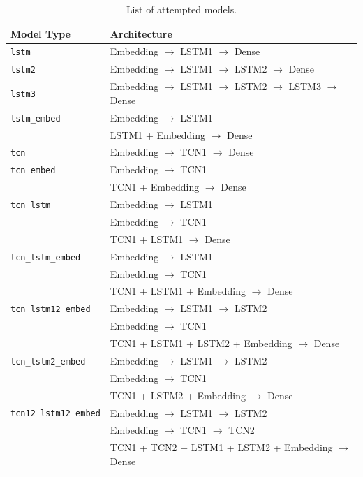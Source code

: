 \documentclass[12pt]{article}
\begin{document}
\begin{table}[h!]
	\centering
	\begin{tabular}{C{0.25\textwidth}C{0.65\textwidth}}
		\toprule
		Model Type                    & Architecture                                                      \\\midrule
		\texttt{lstm}                 & Embedding \(\to\) LSTM1 \(\to\) Dense                             \\\midrule
		\texttt{lstm2}                & Embedding \(\to\) LSTM1 \(\to\) LSTM2 \(\to\) Dense               \\\midrule
		\texttt{lstm3}                & Embedding \(\to\) LSTM1 \(\to\) LSTM2 \(\to\) LSTM3 \(\to\) Dense \\\midrule
		\texttt{lstm\_embed}          & Embedding \(\to\) LSTM1                                           \\
		                              & LSTM1 + Embedding \(\to\) Dense                                   \\\midrule
		\texttt{tcn}                  & Embedding \(\to\) TCN1 \(\to\) Dense                              \\\midrule
		\texttt{tcn\_embed}           & Embedding \(\to\) TCN1                                            \\
		                              & TCN1 + Embedding \(\to\) Dense                                    \\\midrule
		\texttt{tcn\_lstm}            & Embedding \(\to\) LSTM1                                           \\ & Embedding \(\to\) TCN1 \\ & TCN1 + LSTM1 \(\to\) Dense                                   \\\midrule
		\texttt{tcn\_lstm\_embed}     & Embedding \(\to\) LSTM1                                           \\ & Embedding \(\to\) TCN1 \\ & TCN1 + LSTM1  + Embedding \(\to\) Dense                                    \\\midrule
		\texttt{tcn\_lstm12\_embed}   & Embedding \(\to\) LSTM1 \(\to\) LSTM2                             \\ & Embedding \(\to\) TCN1 \\ & TCN1 + LSTM1 + LSTM2 + Embedding \(\to\) Dense            \\\midrule
		\texttt{tcn\_lstm2\_embed}    & Embedding \(\to\) LSTM1 \(\to\) LSTM2                             \\ & Embedding \(\to\) TCN1 \\ & TCN1 + LSTM2 + Embedding \(\to\) Dense       \\\midrule
		\texttt{tcn12\_lstm12\_embed} & Embedding \(\to\) LSTM1 \(\to\) LSTM2                             \\ & Embedding \(\to\) TCN1 \(\to\) TCN2 \\ & TCN1 + TCN2 + LSTM1 + LSTM2 + Embedding \(\to\) Dense           \\\bottomrule
	\end{tabular}
	\caption{List of attempted models.}
\end{table}
\end{document}

